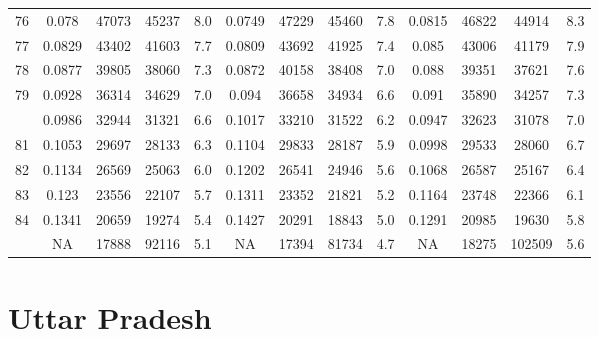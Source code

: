 \documentclass[
  14pt,
]{article}
\begin{document}
\begin{longtable}[t]{lcccccccccccc}
76 & 0.078 & 47073 & 45237 & 8.0 & 0.0749 & 47229 & 45460 & 7.8 & 0.0815 & 46822 & 44914 & 8.3\\
77 & 0.0829 & 43402 & 41603 & 7.7 & 0.0809 & 43692 & 41925 & 7.4 & 0.085 & 43006 & 41179 & 7.9\\
78 & 0.0877 & 39805 & 38060 & 7.3 & 0.0872 & 40158 & 38408 & 7.0 & 0.088 & 39351 & 37621 & 7.6\\
79 & 0.0928 & 36314 & 34629 & 7.0 & 0.094 & 36658 & 34934 & 6.6 & 0.091 & 35890 & 34257 & 7.3\\
\addlinespace
80 & 0.0986 & 32944 & 31321 & 6.6 & 0.1017 & 33210 & 31522 & 6.2 & 0.0947 & 32623 & 31078 & 7.0\\
81 & 0.1053 & 29697 & 28133 & 6.3 & 0.1104 & 29833 & 28187 & 5.9 & 0.0998 & 29533 & 28060 & 6.7\\
82 & 0.1134 & 26569 & 25063 & 6.0 & 0.1202 & 26541 & 24946 & 5.6 & 0.1068 & 26587 & 25167 & 6.4\\
83 & 0.123 & 23556 & 22107 & 5.7 & 0.1311 & 23352 & 21821 & 5.2 & 0.1164 & 23748 & 22366 & 6.1\\
84 & 0.1341 & 20659 & 19274 & 5.4 & 0.1427 & 20291 & 18843 & 5.0 & 0.1291 & 20985 & 19630 & 5.8\\
\addlinespace
85 & NA & 17888 & 92116 & 5.1 & NA & 17394 & 81734 & 4.7 & NA & 18275 & 102509 & 5.6\\*
\end{longtable}

\pagebreak

\hypertarget{uttar-pradesh}{%
\section{Uttar Pradesh}\label{uttar-pradesh}}
\end{document}
